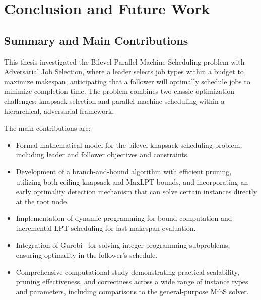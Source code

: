 \chapter{Conclusion and Future Work}
\label{sec:conclusion}

\section{Summary and Main Contributions}

This thesis investigated the Bilevel Parallel Machine Scheduling problem with Adversarial Job Selection, 
where a leader selects job types within a budget to maximize makespan, 
anticipating that a follower will optimally schedule jobs to minimize completion time. 
The problem combines two classic optimization challenges: knapsack selection and parallel machine scheduling within a hierarchical, 
adversarial framework.

The main contributions are:
\begin{itemize}
    \item Formal mathematical model for the bilevel knapsack-scheduling problem, including leader and follower objectives and constraints.
    \item Development of a branch-and-bound algorithm with efficient pruning, utilizing both ceiling knapsack and MaxLPT bounds, and incorporating an early optimality detection mechanism that can solve certain instances directly at the root node.
    \item Implementation of dynamic programming for bound computation and incremental LPT scheduling for fast makespan evaluation.
    \item Integration of Gurobi~\cite{gurobi} for solving integer programming subproblems, ensuring optimality in the follower's schedule.
    \item Comprehensive computational study demonstrating practical scalability, pruning effectiveness, and correctness across a wide range of instance types and parameters, including comparisons to the general-purpose MibS solver.
\end{itemize}

